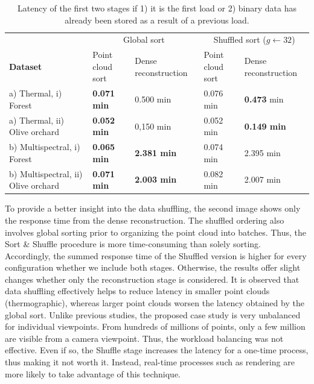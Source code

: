 \renewcommand{\arraystretch}{1.2}
\begin{table}
    \sffamily\footnotesize
    \centering
    \caption{Latency of the first two stages if 1) it is the first load or 2) binary data has already been stored as a result of a previous load. }
    \label{table:shuffling_results}    
    \begin{tabular}{l@{}|ll|ll}
    \toprule
     & \multicolumn{2}{c}{Global sort} & \multicolumn{2}{c}{Shuffled sort ($g \gets 32$)}\\
    \cmidrule{1-5}
    \textbf{Dataset} & Point cloud sort & Dense reconstruction &  Point cloud sort & Dense reconstruction\\
    \cmidrule{1-5}
    a) Thermal, i) Forest & \textbf{0.071 \si{\minute}} & 0.500 \si{\minute}
    & 0.076 \si{\minute} & \textbf{0.473} \si{\minute}\\
    \cmidrule{1-5}
    a) Thermal, ii) Olive orchard & \textbf{0.052 \si{\minute}} & 0,150 \si{\minute}
    & 0.052 \si{\minute} & \textbf{0.149 \si{\minute}}\\
    \cmidrule{1-5}
    b) Multispectral, i) Forest & \textbf{0.065 \si{\minute}} & \textbf{2.381 \si{\minute}}
    & 0.074 \si{\minute} & 2.395 \si{\minute}\\
    \cmidrule{1-5}
    b) Multispectral, ii) Olive orchard & \textbf{0.071 \si{\minute}} & \textbf{2.003 \si{\minute}}
    & 0.082 \si{\minute} & 2.007 \si{\minute}\\
    \bottomrule
    \end{tabular}
\end{table}
\renewcommand{\arraystretch}{1}

To provide a better insight into the data shuffling, the second image shows only the response time from the dense reconstruction. The shuffled ordering also involves global sorting prior to organizing the point cloud into batches. Thus, the Sort \& Shuffle procedure is more time-consuming than solely sorting. Accordingly, the summed response time of the Shuffled version is higher for every configuration whether we include both stages. Otherwise, the results offer slight changes whether only the reconstruction stage is considered. It is observed that data shuffling effectively helps to reduce latency in smaller point clouds (thermographic), whereas larger point clouds worsen the latency obtained by the global sort. Unlike previous studies, the proposed case study is very unbalanced for individual viewpoints. From hundreds of millions of points, only a few million are visible from a camera viewpoint. Thus, the workload balancing was not effective. Even if so, the Shuffle stage increases the latency for a one-time process, thus making it not worth it. Instead, real-time processes such as rendering are more likely to take advantage of this technique.

